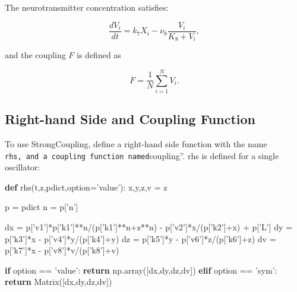 \documentclass[english,a4paper,oneside]{article}
\newenvironment{Shaded}{}{}
\newcommand{\KeywordTok}[1]{\textcolor[rgb]{0.00,0.44,0.13}{\textbf{#1}}}
\newcommand{\StringTok}[1]{\textcolor[rgb]{0.25,0.44,0.63}{#1}}
\newcommand{\ControlFlowTok}[1]{\textcolor[rgb]{0.00,0.44,0.13}{\textbf{#1}}}
\newcommand{\OperatorTok}[1]{\textcolor[rgb]{0.40,0.40,0.40}{#1}}
\newcommand{\NormalTok}[1]{#1}
\begin{document}
The neurotransmitter concentration satisfies:

\[\frac{dV_i}{dt} = k_7 X_i - \nu_8 \frac{V_i}{K_8 + V_i},\]

and the coupling \(F\) is defined as

\[F = \frac{1}{N}\sum_{i=1}^N V_i.\]

\subsection{Right-hand Side and Coupling
Function}\label{right-hand-side-and-coupling-function}

To use StrongCoupling, define a right-hand side function with the name
\texttt{rhs\textquotesingle{}\textquotesingle{},\ and\ a\ coupling\ function\ named}coupling''.
rhs is defined for a single oscillator:

\begin{Shaded}
\begin{Highlighting}[]
\KeywordTok{def}\NormalTok{ rhs(t,z,pdict,option}\OperatorTok{=}\StringTok{'value'}\NormalTok{):}
\NormalTok{    x,y,z,v }\OperatorTok{=}\NormalTok{ z}
    
\NormalTok{    p }\OperatorTok{=}\NormalTok{ pdict}
\NormalTok{    n }\OperatorTok{=}\NormalTok{ p[}\StringTok{'n'}\NormalTok{]}
    
\NormalTok{    dx }\OperatorTok{=}\NormalTok{ p[}\StringTok{'v1'}\NormalTok{]}\OperatorTok{*}\NormalTok{p[}\StringTok{'k1'}\NormalTok{]}\OperatorTok{**}\NormalTok{n}\OperatorTok{/}\NormalTok{(p[}\StringTok{'k1'}\NormalTok{]}\OperatorTok{**}\NormalTok{n}\OperatorTok{+}\NormalTok{z}\OperatorTok{**}\NormalTok{n) }\OperatorTok{-}\NormalTok{ p[}\StringTok{'v2'}\NormalTok{]}\OperatorTok{*}\NormalTok{x}\OperatorTok{/}\NormalTok{(p[}\StringTok{'k2'}\NormalTok{]}\OperatorTok{+}\NormalTok{x) }\OperatorTok{+}\NormalTok{ p[}\StringTok{'L'}\NormalTok{]}
\NormalTok{    dy }\OperatorTok{=}\NormalTok{ p[}\StringTok{'k3'}\NormalTok{]}\OperatorTok{*}\NormalTok{x }\OperatorTok{-}\NormalTok{ p[}\StringTok{'v4'}\NormalTok{]}\OperatorTok{*}\NormalTok{y}\OperatorTok{/}\NormalTok{(p[}\StringTok{'k4'}\NormalTok{]}\OperatorTok{+}\NormalTok{y)}
\NormalTok{    dz }\OperatorTok{=}\NormalTok{ p[}\StringTok{'k5'}\NormalTok{]}\OperatorTok{*}\NormalTok{y }\OperatorTok{-}\NormalTok{ p[}\StringTok{'v6'}\NormalTok{]}\OperatorTok{*}\NormalTok{z}\OperatorTok{/}\NormalTok{(p[}\StringTok{'k6'}\NormalTok{]}\OperatorTok{+}\NormalTok{z)}
\NormalTok{    dv }\OperatorTok{=}\NormalTok{ p[}\StringTok{'k7'}\NormalTok{]}\OperatorTok{*}\NormalTok{x }\OperatorTok{-}\NormalTok{ p[}\StringTok{'v8'}\NormalTok{]}\OperatorTok{*}\NormalTok{v}\OperatorTok{/}\NormalTok{(p[}\StringTok{'k8'}\NormalTok{]}\OperatorTok{+}\NormalTok{v)}
    
    \ControlFlowTok{if}\NormalTok{ option }\OperatorTok{==} \StringTok{'value'}\NormalTok{:}
        \ControlFlowTok{return}\NormalTok{ np.array([dx,dy,dz,dv])}
    \ControlFlowTok{elif}\NormalTok{ option }\OperatorTok{==} \StringTok{'sym'}\NormalTok{:}
        \ControlFlowTok{return}\NormalTok{ Matrix([dx,dy,dz,dv])}
\end{Highlighting}
\end{Shaded}
\end{document}
